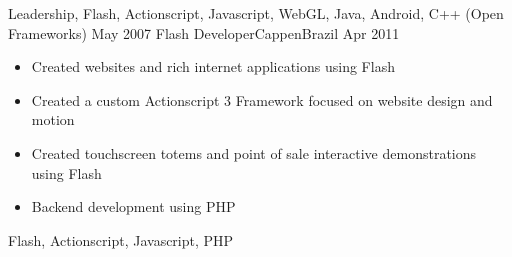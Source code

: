 \begin{experiences}
{\begin{itemize}
                      \end{itemize}
                    }
                    {Leadership, Flash, Actionscript, Javascript, WebGL, Java, Android, C++ (Open Frameworks)}
  \emptySeparator
  \experience
    {May 2007}     {Flash Developer}{Cappen}{Brazil}
    {Apr 2011}    {
                      \begin{itemize}
                        \item Created websites and rich internet applications using Flash
                        \item Created a custom Actionscript 3 Framework focused on website design and motion
                        \item Created touchscreen totems and point of sale interactive demonstrations using Flash
                        \item Backend development using PHP
                      \end{itemize}
                    }
                    {Flash, Actionscript, Javascript, PHP}
  \emptySeparator
\end{experiences}
